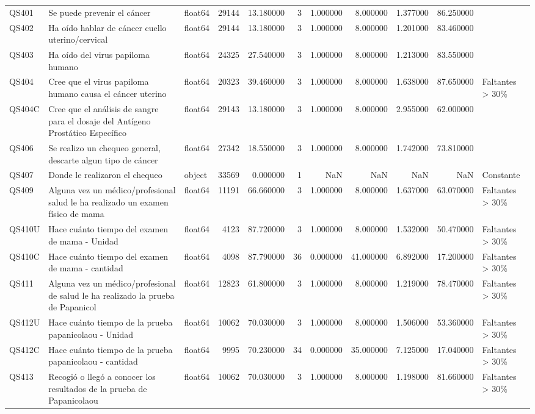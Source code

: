 \begin{longtable}{lllrrrrrrrl}
QS401 & Se puede prevenir el cáncer & float64 & 29144 & 13.180000 & 3 & 1.000000 & 8.000000 & 1.377000 & 86.250000 &  \\
QS402 & Ha oído hablar de cáncer cuello uterino/cervical & float64 & 29144 & 13.180000 & 3 & 1.000000 & 8.000000 & 1.201000 & 83.460000 &  \\
QS403 & Ha oído del virus papiloma humano & float64 & 24325 & 27.540000 & 3 & 1.000000 & 8.000000 & 1.213000 & 83.550000 &  \\
QS404 & Cree que el virus papiloma humano causa el cáncer uterino & float64 & 20323 & 39.460000 & 3 & 1.000000 & 8.000000 & 1.638000 & 87.650000 & Faltantes > 30\% \\
QS404C & Cree que el análisis de sangre para el dosaje del Antígeno Prostático Específico & float64 & 29143 & 13.180000 & 3 & 1.000000 & 8.000000 & 2.955000 & 62.000000 &  \\
QS406 & Se realizo un chequeo general, descarte algun tipo de cáncer & float64 & 27342 & 18.550000 & 3 & 1.000000 & 8.000000 & 1.742000 & 73.810000 &  \\
QS407 & Donde le realizaron el chequeo & object & 33569 & 0.000000 & 1 & NaN & NaN & NaN & NaN & Constante \\
QS409 & Alguna vez un médico/profesional salud le ha realizado un examen físico de mama & float64 & 11191 & 66.660000 & 3 & 1.000000 & 8.000000 & 1.637000 & 63.070000 & Faltantes > 30\% \\
QS410U & Hace cuánto tiempo del examen de mama - Unidad & float64 & 4123 & 87.720000 & 3 & 1.000000 & 8.000000 & 1.532000 & 50.470000 & Faltantes > 30\% \\
QS410C & Hace cuánto tiempo del examen de mama - cantidad & float64 & 4098 & 87.790000 & 36 & 0.000000 & 41.000000 & 6.892000 & 17.200000 & Faltantes > 30\% \\
QS411 & Alguna vez un médico/profesional de salud le ha realizado la prueba de Papanicol & float64 & 12823 & 61.800000 & 3 & 1.000000 & 8.000000 & 1.219000 & 78.470000 & Faltantes > 30\% \\
QS412U & Hace cuánto tiempo de la prueba papanicolaou - Unidad & float64 & 10062 & 70.030000 & 3 & 1.000000 & 8.000000 & 1.506000 & 53.360000 & Faltantes > 30\% \\
QS412C & Hace cuánto tiempo de la prueba papanicolaou - cantidad & float64 & 9995 & 70.230000 & 34 & 0.000000 & 35.000000 & 7.125000 & 17.040000 & Faltantes > 30\% \\
QS413 & Recogió o llegó a  conocer los resultados de la prueba de Papanicolaou & float64 & 10062 & 70.030000 & 3 & 1.000000 & 8.000000 & 1.198000 & 81.660000 & Faltantes > 30\% \\

\end{longtable}
